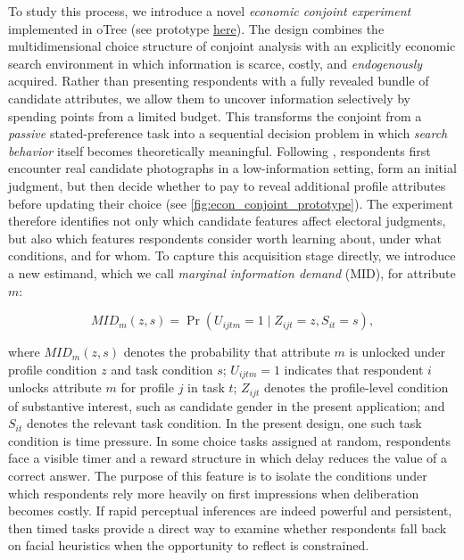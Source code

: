 \documentclass[11pt]{article}
\begin{document}
To study this process, we introduce a novel \emph{economic conjoint experiment} implemented in oTree (see prototype \href{https://econ-conjoint-project.onrender.com/}{here}). The design combines the multidimensional choice structure of conjoint analysis \parencite{Hainmueller2014} with an explicitly economic search environment in which information is scarce, costly, and \emph{endogenously} acquired. Rather than presenting respondents with a fully revealed bundle of candidate attributes, we allow them to uncover information selectively by spending points from a limited budget. This transforms the conjoint from a \emph{passive} stated-preference task into a sequential decision problem in which \emph{search behavior} itself becomes theoretically meaningful. Following \textcite{Antonakis2009a}, respondents first encounter real candidate photographs in a low-information setting, form an initial judgment, but then decide whether to pay to reveal additional profile attributes before updating their choice (see \autoref{fig:econ_conjoint_prototype}). The experiment therefore identifies not only which candidate features affect electoral judgments, but also which features respondents consider worth learning about, under what conditions, and for whom. To capture this acquisition stage directly, we introduce a new estimand, which we call \emph{marginal information demand} (MID), for attribute $m$:

\[
MID_m(z,s) = \Pr(U_{ijtm}=1 \mid Z_{ijt}=z, S_{it}=s),
\]

where $MID_m(z,s)$ denotes the probability that attribute $m$ is unlocked under profile condition $z$ and task condition $s$; $U_{ijtm}=1$ indicates that respondent $i$ unlocks attribute $m$ for profile $j$ in task $t$; $Z_{ijt}$ denotes the profile-level condition of substantive interest, such as candidate gender in the present application; and $S_{it}$ denotes the relevant task condition. In the present design, one such task condition is time pressure. In some choice tasks assigned at random, respondents face a visible timer and a reward structure in which delay reduces the value of a correct answer. The purpose of this feature is to isolate the conditions under which respondents rely more heavily on first impressions when deliberation becomes costly. If rapid perceptual inferences are indeed powerful and persistent, then timed tasks provide a direct way to examine whether respondents fall back on facial heuristics when the opportunity to reflect is constrained.
\end{document}
